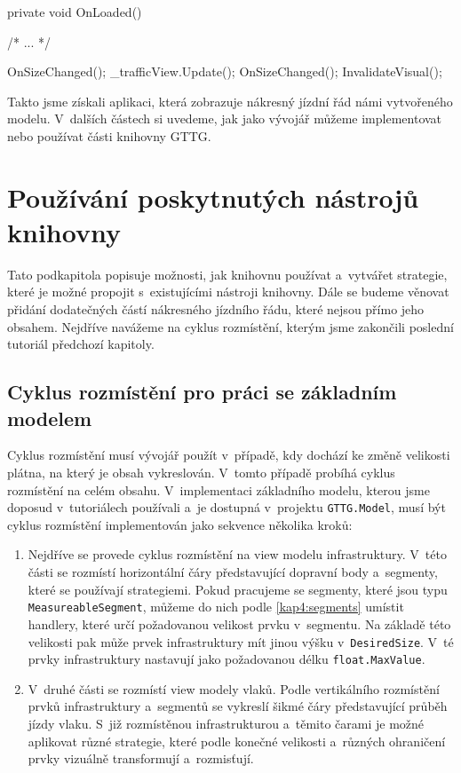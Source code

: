 \begin{csharpcode}
private void OnLoaded() {
	/* ... */ 

	OnSizeChanged();
	_trafficView.Update();
	OnSizeChanged();
	InvalidateVisual();
}
\end{csharpcode}

Takto jsme získali aplikaci, která zobrazuje nákresný jízdní řád námi vytvořeného modelu. V~dalších částech si uvedeme, jak jako vývojář můžeme implementovat nebo používat části knihovny GTTG.
\newpage
\section*{Používání poskytnutých nástrojů knihovny}
Tato podkapitola popisuje možnosti, jak knihovnu používat a~vytvářet strategie, které je možné propojit s~existujícími nástroji knihovny. Dále se budeme věnovat přidání dodatečných částí nákresného jízdního řádu, které nejsou přímo jeho obsahem. Nejdříve navážeme na cyklus rozmístění, kterým jsme zakončili poslední tutoriál předchozí kapitoly.

\subsection*{Cyklus rozmístění pro práci se základním modelem}
Cyklus rozmístění musí vývojář použít v~případě, kdy dochází ke změně velikosti plátna, na který je obsah vykreslován. V~tomto případě probíhá cyklus rozmístění na celém obsahu. V~implementaci základního modelu, kterou jsme doposud v~tutoriálech používali a~je dostupná v~projektu \texttt{GTTG.Model}, musí být cyklus rozmístění implementován jako sekvence několika kroků:

\begin{enumerate}
\item  Nejdříve se provede cyklus rozmístění na view modelu infrastruktury. V~této části se rozmístí horizontální čáry představující dopravní body a~segmenty, které se používají strategiemi. Pokud pracujeme se segmenty, které jsou typu \texttt{MeasureableSegment}, můžeme do nich podle \ref{kap4:segments} umístit handlery, které určí požadovanou velikost prvku v~segmentu. Na základě této velikosti pak může prvek infrastruktury mít jinou výšku v~\texttt{DesiredSize}. V~té prvky infrastruktury nastavují jako požadovanou délku \texttt{float.MaxValue}.

\item V~druhé části se rozmístí view modely vlaků. Podle vertikálního rozmístění prvků infrastruktury a~segmentů se vykreslí šikmé čáry představující průběh jízdy vlaku. S~již rozmístěnou infrastrukturou a~těmito čarami je možné aplikovat různé strategie, které podle konečné velikosti a~různých ohraničení prvky vizuálně transformují a~rozmisťují.
\end{enumerate}

